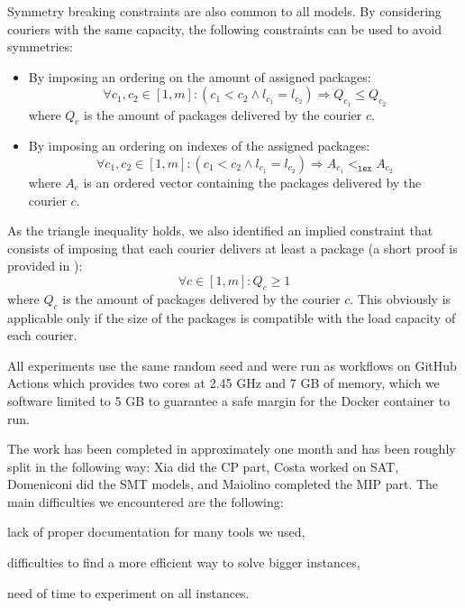 \documentclass{article}
\begin{document}
    Symmetry breaking constraints are also common to all models. By considering couriers with the same capacity, the following constraints can be used to avoid symmetries:
    \begin{itemize}
        \item By imposing an ordering on the amount of assigned packages:
            \begin{equation}
                \label{eq:cp_symm_amount}
                \forall c_1, c_2 \in [1, m]: (c_1 < c_2 \land l_{c_1} = l_{c_2}) \Rightarrow Q_{c_1} \leq Q_{c_2}
            \end{equation}
            where $Q_c$ is the amount of packages delivered by the courier $c$.
        \item By imposing an ordering on indexes of the assigned packages:
            \begin{equation}
                \label{eq:cp_symm_packs}
                \forall c_1, c_2 \in [1, m]: (c_1 < c_2 \land l_{c_1} = l_{c_2}) \Rightarrow A_{c_1} <_\texttt{lex} A_{c_2}
            \end{equation}
            where $A_c$ is an ordered vector containing the packages delivered by the courier $c$.
    \end{itemize}

    As the triangle inequality holds, we also identified an implied constraint that consists of imposing that each courier delivers at least a package (a short proof is provided in ):
    \begin{equation}
        \label{eq:impl_constr}
        \forall c \in [1, m]: Q_c \geq 1  
    \end{equation}
    where $Q_c$ is the amount of packages delivered by the courier $c$.
    This obviously is applicable only if the size of the packages is compatible with the load capacity of each courier.

    All experiments use the same random seed and were run as workflows on GitHub Actions which provides two cores at 2.45 GHz and 7 GB of memory, which we software limited to 5 GB to guarantee a safe margin for the Docker container to run.

    The work has been completed in approximately one month and has been roughly split in the following way: Xia did the CP part, Costa worked on SAT, Domeniconi did the SMT models, and Maiolino completed the MIP part. The main difficulties we encountered are the following: 
    \begin{enumerate*}[label=(\roman*)]
        \item lack of proper documentation for many tools we used,
        \item difficulties to find a more efficient way to solve bigger instances,
        \item need of time to experiment on all instances.
    \end{enumerate*}
\end{document}
